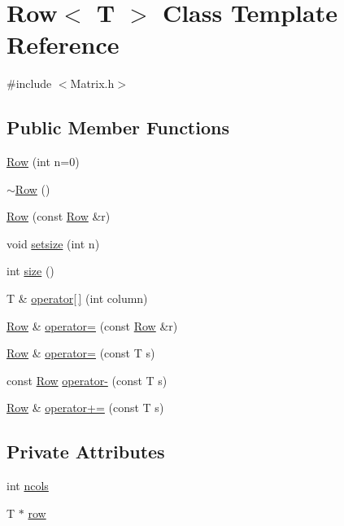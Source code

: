 \hypertarget{classRow}{
\section{Row$<$ T $>$ Class Template Reference}
\label{classRow}
}


{\ttfamily \#include $<$Matrix.h$>$}

\subsection*{Public Member Functions}
\begin{DoxyCompactItemize}
\item 
\hyperlink{classRow_aad13a5275c04ed243620bb02164806a1}{Row} (int n=0)
\item 
\hyperlink{classRow_a8e888a33060156cd2e3757a95e9feee1}{$\sim$Row} ()
\item 
\hyperlink{classRow_a3c76905ddd4522c92da0d8a9e24a22a1}{Row} (const \hyperlink{classRow}{Row} \&r)
\item 
void \hyperlink{classRow_aebdf0fa4ce1946b8d9ef3c6f266edb7d}{setsize} (int n)
\item 
int \hyperlink{classRow_ac3239fe892db0029206a7e0d888595d1}{size} ()
\item 
T \& \hyperlink{classRow_a7f371e29268ff2a5e508b32229250d8d}{operator\mbox{[}$\,$\mbox{]}} (int column)
\item 
\hyperlink{classRow}{Row} \& \hyperlink{classRow_a877484e061eef2a179cc28d30b3ec542}{operator=} (const \hyperlink{classRow}{Row} \&r)
\item 
\hyperlink{classRow}{Row} \& \hyperlink{classRow_a1511d921c037da716d3ca7b6da79ab94}{operator=} (const T s)
\item 
const \hyperlink{classRow}{Row} \hyperlink{classRow_a0f6c09f74d0ab002c9af9ad0dfd89399}{operator-\/} (const T s)
\item 
\hyperlink{classRow}{Row} \& \hyperlink{classRow_a46ffce8561e1869e2a4d3a7ac107469b}{operator+=} (const T s)
\end{DoxyCompactItemize}
\subsection*{Private Attributes}
\begin{DoxyCompactItemize}
\item 
int \hyperlink{classRow_add6775001d80906bbc22d3d7a5a42fa1}{ncols}
\item 
T $\ast$ \hyperlink{classRow_a76906ed1430eeaa38f694dbb3a841442}{row}
\end{DoxyCompactItemize}

